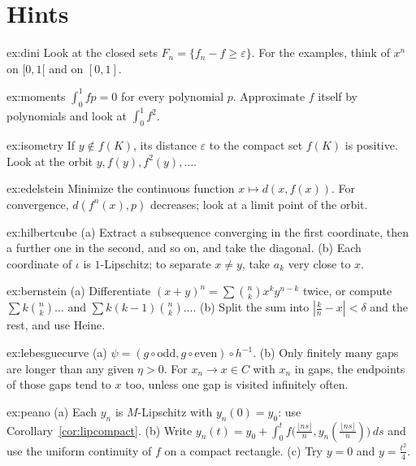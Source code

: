 \section{Hints}

\begin{hint}{ex:dini}
Look at the closed sets $F_n=\{f_n-f\ge\varepsilon\}$. For the examples, think of $x^n$ on $[0,1[$ and on $[0,1]$.
\end{hint}
\begin{hint}{ex:moments}
$\int_0^1fp=0$ for every polynomial $p$. Approximate $f$ itself by polynomials and look at $\int_0^1f^2$.
\end{hint}
\begin{hint}{ex:isometry}
If $y\notin f(K)$, its distance $\varepsilon$ to the compact set $f(K)$ is positive. Look at the orbit $y,f(y),f^2(y),\dots$.
\end{hint}
\begin{hint}{ex:edelstein}
Minimize the continuous function $x\mapsto d(x,f(x))$. For convergence, $d(f^n(x),p)$ decreases; look at a limit point of the orbit.
\end{hint}
\begin{hint}{ex:hilbertcube}
(a) Extract a subsequence converging in the first coordinate, then a further one in the second, and so on, and take the diagonal. (b) Each
coordinate of $\iota$ is $1$-Lipschitz; to separate $x\ne y$, take $a_k$ very close to $x$.
\end{hint}
\begin{hint}{ex:bernstein}
(a) Differentiate $(x+y)^n=\sum\binom nkx^ky^{n-k}$ twice, or compute $\sum k\binom nk\ldots$ and $\sum k(k-1)\binom nk\ldots$. (b) Split the sum into $|\frac kn-x|<\delta$ and the rest, and use Heine.
\end{hint}
\begin{hint}{ex:lebesguecurve}
(a) $\psi=(g\circ\mathrm{odd},g\circ\mathrm{even})\circ h^{-1}$. (b) Only finitely many gaps are longer than any given $\eta>0$. For $x_n\to x\in C$ with $x_n$ in gaps, the endpoints
of those gaps tend to $x$ too, unless one gap is visited infinitely often.
\end{hint}
\begin{hint}{ex:peano}
(a) Each $y_n$ is $M$-Lipschitz with $y_n(0)=y_0$: use Corollary~\ref{cor:lipcompact}. (b) Write $y_n(t)=y_0+\int_0^tf\bigl(\frac{\lfloor ns\rfloor}n,y_n(\frac{\lfloor ns\rfloor}n)\bigr)\,ds$ and use the uniform continuity of $f$ on a
compact rectangle. (c) Try $y=0$ and $y=\frac{t^2}4$.
\end{hint}

